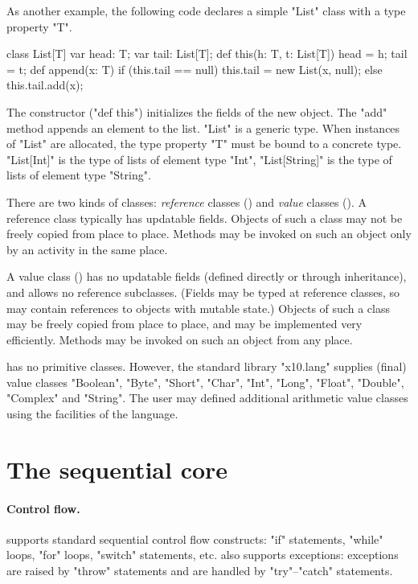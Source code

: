 As another example,
the following code declares a simple \xcd"List" class with a
type property \xcd"T".
\begin{xten}
class List[T] {
    var head: T;
    var tail: List[T];
    def this(h: T, t: List[T]) { head = h; tail = t; }
    def append(x: T) {
        if (this.tail == null)
                this.tail = new List(x, null);
          else
                this.tail.add(x);
    }
}
\end{xten}
The constructor (\xcd"def this") initializes the fields of the new object.
The \xcd"add" method appends an element to the list.
\xcd"List" is a generic type.  When  instances of \xcd"List" are
allocated, the type property \xcd"T" must be bound to a concrete
type.  \xcd"List[Int]" is the type of lists of element type
\xcd"Int", \xcd"List[String]" is the type of lists of element
type \xcd"String".

There are two kinds of classes: \emph{reference} classes
() and \emph{value} classes
().
A reference class typically has updatable fields. Objects of such a
class may not be freely copied from place to place. Methods may be
invoked on such an object only by an activity in the same place.

A value class () has no updatable fields (defined
directly or through inheritance), and allows no reference
subclasses. (Fields may be typed at reference classes, so may contain
references to objects with mutable state.) Objects of such a class may
be freely copied from place to place, and may be implemented very
efficiently. Methods may be invoked on such an object from any place.

\Xten{} has no primitive classes. However, the standard library
\xcd"x10.lang" supplies (final) value classes \xcd"Boolean", \xcd"Byte",
\xcd"Short", \xcd"Char", \xcd"Int", \xcd"Long", \xcd"Float",
\xcd"Double", \xcd"Complex" and \xcd"String". The user may defined
additional arithmetic value classes using the facilities of the
language.

\section{The sequential core}

\paragraph{Control flow.}  \Xten{} supports standard sequential control flow
constructs: \xcd"if" statements, \xcd"while" loops, \xcd"for" loops,
\xcd"switch" statements, etc.  \Xten{} also supports exceptions: exceptions are
raised by \xcd"throw" statements and are handled by \xcd"try"--\xcd"catch"
statements.

